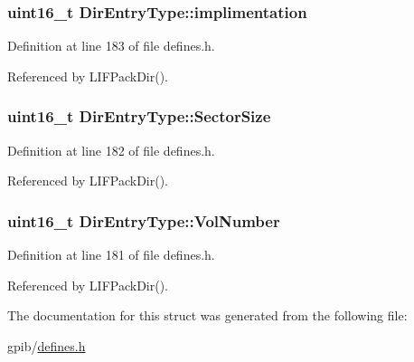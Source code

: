 \subsubsection[{\texorpdfstring{implimentation}{implimentation}}]{\setlength{\rightskip}{0pt plus 5cm}uint16\+\_\+t Dir\+Entry\+Type\+::implimentation}\hypertarget{structDirEntryType_ac406aba583917a5c26ed94df41a368a9}{}\label{structDirEntryType_ac406aba583917a5c26ed94df41a368a9}


Definition at line 183 of file defines.\+h.



Referenced by L\+I\+F\+Pack\+Dir().

\subsubsection[{\texorpdfstring{Sector\+Size}{SectorSize}}]{\setlength{\rightskip}{0pt plus 5cm}uint16\+\_\+t Dir\+Entry\+Type\+::\+Sector\+Size}\hypertarget{structDirEntryType_ab92ab53cd08e0ffe0f0098c583ce5eba}{}\label{structDirEntryType_ab92ab53cd08e0ffe0f0098c583ce5eba}


Definition at line 182 of file defines.\+h.



Referenced by L\+I\+F\+Pack\+Dir().

\subsubsection[{\texorpdfstring{Vol\+Number}{VolNumber}}]{\setlength{\rightskip}{0pt plus 5cm}uint16\+\_\+t Dir\+Entry\+Type\+::\+Vol\+Number}\hypertarget{structDirEntryType_a2fe2eefd68aafcce0bb14bf53e4cba00}{}\label{structDirEntryType_a2fe2eefd68aafcce0bb14bf53e4cba00}


Definition at line 181 of file defines.\+h.



Referenced by L\+I\+F\+Pack\+Dir().



The documentation for this struct was generated from the following file\+:\begin{DoxyCompactItemize}
\item 
gpib/\hyperlink{defines_8h}{defines.\+h}\end{DoxyCompactItemize}
